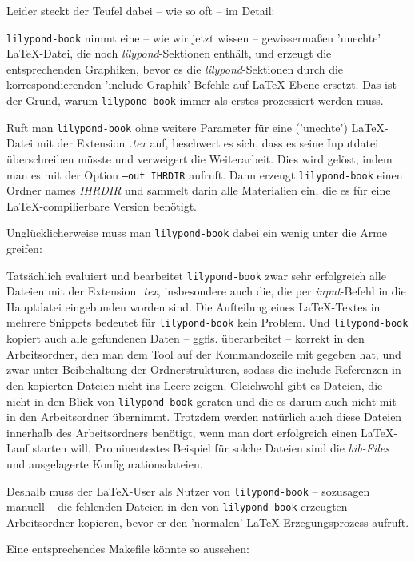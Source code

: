 Leider steckt der Teufel dabei -- wie so oft -- im Detail: 

\label{LilyPondGraphics}\texttt{lilypond-book} nimmt eine -- wie wir jetzt
wissen -- gewissermaßen 'unechte' \LaTeX-Datei, die noch
\textit{lilypond}-Sektionen enthält, und erzeugt die entsprechenden Graphiken,
bevor es die \textit{lilypond}-Sektionen durch die korrespondierenden
'include-Graphik'-Befehle auf \LaTeX-Ebene ersetzt. Das ist der Grund, warum
\texttt{lilypond-book} immer als erstes prozessiert werden muss.

Ruft man \texttt{lilypond-book} ohne weitere Parameter für eine ('unechte')
\LaTeX-Datei mit der Extension \textit{.tex} auf, beschwert es sich, dass es seine
Inputdatei überschreiben müsste und verweigert die Weiterarbeit. Dies wird
gelöst, indem man es mit der Option \texttt{--out IHRDIR} aufruft. Dann erzeugt
\texttt{lilypond-book} einen Ordner names \textit{IHRDIR} und sammelt darin
alle Materialien ein, die es für eine \LaTeX-compilierbare Version benötigt.

Unglücklicherweise muss man \texttt{lilypond-book} dabei ein wenig unter die Arme
greifen:

Tatsächlich evaluiert und bearbeitet \texttt{lilypond-book} zwar sehr
erfolgreich alle Dateien mit der Extension \textit{.tex}, insbesondere auch die,
die per \textit{input}-Befehl in die Hauptdatei eingebunden worden sind. Die
Aufteilung eines LaTeX-Textes in mehrere Snippets bedeutet für
\texttt{lilypond-book} kein Problem. Und \texttt{lilypond-book} kopiert auch
alle gefundenen Daten -- ggfls. überarbeitet -- korrekt in den Arbeitsordner,
den man dem Tool auf der Kommandozeile mit gegeben hat, und zwar unter
Beibehaltung der Ordnerstrukturen, sodass die include-Referenzen in den
kopierten Dateien nicht ins Leere zeigen. Gleichwohl gibt es Dateien, die nicht
in den Blick von \texttt{lilypond-book} geraten und die es darum auch nicht mit
in den Arbeitsordner übernimmt. Trotzdem werden natürlich auch diese Dateien
innerhalb des Arbeitsordners benötigt, wenn man dort erfolgreich einen
\LaTeX-Lauf starten will. Prominentestes Beispiel für solche Dateien sind die
\textit{bib-Files} und ausgelagerte Konfigurationsdateien.

Deshalb muss der \LaTeX-User als Nutzer von \texttt{lilypond-book} -- sozusagen
manuell -- die fehlenden Dateien in den von \texttt{lilypond-book} erzeugten
Arbeitsordner kopieren, bevor er den 'normalen' \LaTeX-Erzegungsprozess aufruft.

Eine entsprechendes Makefile könnte so aussehen:

